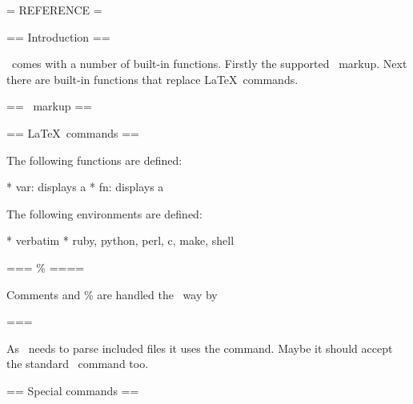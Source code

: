 
= REFERENCE =

== Introduction ==

\wikitexer\ comes with a number of built-in functions. Firstly the
supported \mediawiki\ markup. Next there are built-in functions that
replace \LaTeX\ commands. 

== \mediawiki\ markup ==

== \LaTeX\ commands ==

The following functions are defined:

* var: displays a 
* fn:  displays a 

The following environments are defined:

* verbatim
* ruby, python, perl, c, make, shell

=== \% ====

Comments and \% are handled the \latex\ way by \wikitexer\

=== 

As \wiktexer\ needs to parse included files it uses the
 command. Maybe it should accept the standard
\ command too.

== Special commands ==
